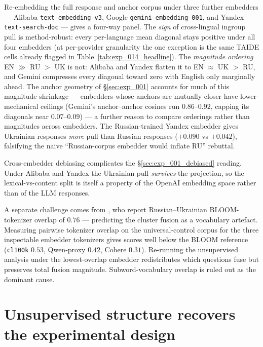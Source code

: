 Re-embedding the full response and anchor corpus under three further
embedders --- Alibaba \verb|text-embedding-v3|, Google
\verb|gemini-embedding-001|, and Yandex \verb|text-search-doc| ---
gives a four-way panel. The \emph{sign} of cross-lingual ingroup
pull is method-robust: every per-language mean diagonal stays
positive under all four embedders (at per-provider granularity the
one exception is the same TAIDE cells already flagged in
Table~\ref{tab:exp_014_headline}). The \emph{magnitude ordering} EN ${\gg}$ RU ${>}$ UK is
not: Alibaba and Yandex flatten it to EN ${\approx}$ UK ${>}$ RU,
and Gemini compresses every diagonal toward zero with English only
marginally ahead. The anchor geometry of \S\ref{sec:exp_001}
accounts for much of this magnitude shrinkage --- embedders whose
anchors are mutually closer have lower mechanical ceilings
(Gemini's anchor--anchor cosines run $0.86$--$0.92$, capping its
diagonals near $0.07$--$0.09$) --- a further reason to compare
orderings rather than magnitudes across embedders.
The Russian-trained Yandex embedder gives Ukrainian responses
\emph{more} pull than Russian responses ($+0.090$ vs $+0.042$),
falsifying the naive ``Russian-corpus embedder would inflate RU''
rebuttal.

Cross-embedder debiasing complicates the
\S\ref{sec:exp_001_debiased} reading. Under
Alibaba and Yandex the Ukrainian pull \emph{survives} the
projection, so the lexical-vs-content split is itself a property of
the OpenAI embedding space rather than of the LLM responses.

A separate challenge comes from \citet{qi2023crosslingual}, who
report Russian--Ukrainian BLOOM-tokenizer overlap of $0.76$ ---
predicting the cluster fusion as a vocabulary artefact. Measuring
pairwise tokenizer overlap on the universal-control corpus for the
three inspectable embedder tokenizers gives scores well below the
BLOOM reference (\verb|cl100k| $0.53$, Qwen-proxy $0.42$, Cohere
$0.31$). Re-running the unsupervised analysis under the
lowest-overlap embedder redistributes which questions fuse but
preserves total fusion magnitude. Subword-vocabulary overlap is
ruled out as the dominant cause.

\section{Unsupervised structure recovers the experimental
  design}\label{sec:exp_016}\label{sec:exp_016_outliers}\label{sec:exp_016_anchor_projection}

